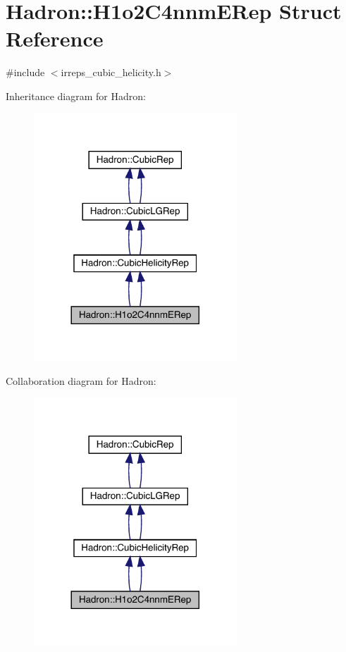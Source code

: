 \hypertarget{structHadron_1_1H1o2C4nnmERep}{}\section{Hadron\+:\+:H1o2\+C4nnm\+E\+Rep Struct Reference}
\label{structHadron_1_1H1o2C4nnmERep}


{\ttfamily \#include $<$irreps\+\_\+cubic\+\_\+helicity.\+h$>$}



Inheritance diagram for Hadron\+:\nopagebreak
\begin{figure}[H]
\begin{center}
\leavevmode
\includegraphics[width=216pt]{d0/d2b/structHadron_1_1H1o2C4nnmERep__inherit__graph}
\end{center}
\end{figure}


Collaboration diagram for Hadron\+:\nopagebreak
\begin{figure}[H]
\begin{center}
\leavevmode
\includegraphics[width=216pt]{dd/db8/structHadron_1_1H1o2C4nnmERep__coll__graph}
\end{center}
\end{figure}
